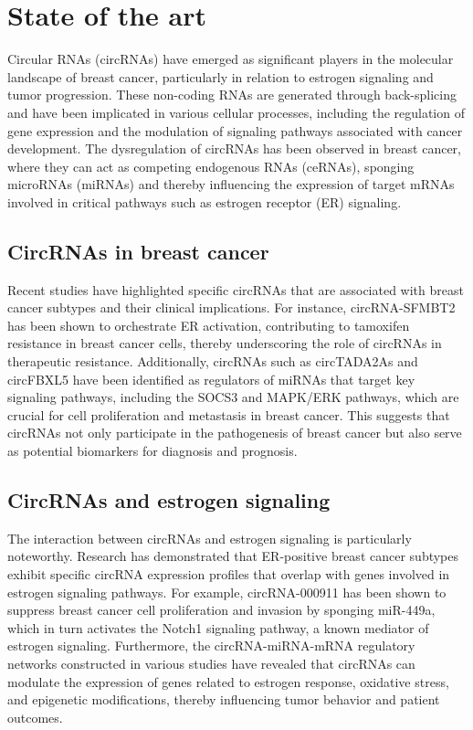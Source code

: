 \section{State of the art}
Circular RNAs (circRNAs) have emerged as significant players in the molecular
landscape of breast cancer, particularly in relation to estrogen signaling and
tumor progression. These non-coding RNAs are generated through back-splicing and
have been implicated in various cellular processes, including the regulation of
gene expression and the modulation of signaling pathways associated with cancer
development\supercite{li_circrna-sfmbt2_2023,tran_new_2020}. The dysregulation
of circRNAs has
been observed in breast cancer, where they can act as competing endogenous RNAs
(ceRNAs), sponging microRNAs (miRNAs) and thereby influencing the expression of
target mRNAs involved in critical pathways such as estrogen receptor (ER)
signaling\supercite{nair_circular_2016,xu_circrna_2022}.

\subsection{CircRNAs in breast cancer}
Recent studies have highlighted specific circRNAs that are associated with
breast cancer subtypes and their clinical implications. For instance,
circRNA-SFMBT2 has been shown to orchestrate ER\textalpha{} activation, contributing to
tamoxifen resistance in breast cancer cells, thereby underscoring the role of
circRNAs in therapeutic resistance\supercite{li_circrna-sfmbt2_2023}. Additionally, circRNAs such as
circTADA2As and circFBXL5 have been identified as regulators of miRNAs that
target key signaling pathways, including the SOCS3 and MAPK/ERK pathways, which
are crucial for cell proliferation and metastasis in breast
cancer\supercite{xu_circtada2as_2019,gao_hsa_circrna_0006528_2019}. This
suggests that circRNAs not only participate in the
pathogenesis of breast cancer but also serve as potential biomarkers for
diagnosis and prognosis\supercite{liu_influence_2021,chen_circepsti1_2018}.

\subsection{CircRNAs and estrogen signaling}
The interaction between circRNAs and estrogen signaling is particularly
noteworthy. Research has demonstrated that ER-positive breast cancer subtypes
exhibit specific circRNA expression profiles that overlap with genes involved in
estrogen signaling pathways\supercite{nair_circular_2016}. For example, circRNA-000911 has
been shown to suppress breast cancer cell proliferation and invasion by sponging
miR-449a, which in turn activates the Notch1 signaling pathway, a known mediator
of estrogen signaling\supercite{wang_comprehensive_2018}. Furthermore, the circRNA-miRNA-mRNA
regulatory networks constructed in various studies have revealed that circRNAs
can modulate the expression of genes related to estrogen response, oxidative
stress, and epigenetic modifications, thereby influencing tumor behavior and
patient outcomes\supercite{xu_circrna_2022,nair_circular_2016}.
